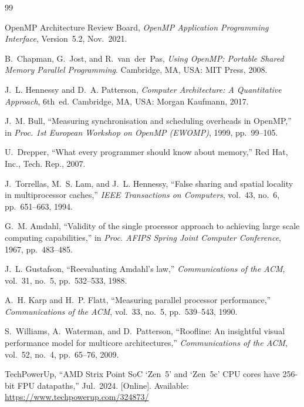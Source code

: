 \documentclass[conference,a4paper]{IEEEtran}
\begin{document}
\begingroup
\renewcommand{\section}[2]{}
\begin{thebibliography}{99}

OpenMP Architecture Review Board, \emph{OpenMP Application Programming
Interface}, Version~5.2, Nov.~2021.

B.~Chapman, G.~Jost, and R.~van~der~Pas, \emph{Using OpenMP: Portable Shared
Memory Parallel Programming}. Cambridge, MA, USA: MIT Press, 2008.

J.~L. Hennessy and D.~A. Patterson, \emph{Computer Architecture: A Quantitative
Approach}, 6th~ed. Cambridge, MA, USA: Morgan Kaufmann, 2017.

J.~M. Bull, ``Measuring synchronisation and scheduling overheads in OpenMP,''
in \emph{Proc. 1st European Workshop on OpenMP (EWOMP)}, 1999, pp.~99--105.

U.~Drepper, ``What every programmer should know about memory,'' Red Hat, Inc.,
Tech. Rep., 2007.

J.~Torrellas, M.~S. Lam, and J.~L. Hennessy, ``False sharing and spatial
locality in multiprocessor caches,'' \emph{IEEE Transactions on Computers},
vol.~43, no.~6, pp.~651--663, 1994.

G.~M. Amdahl, ``Validity of the single processor approach to achieving large
scale computing capabilities,'' in \emph{Proc. AFIPS Spring Joint Computer
Conference}, 1967, pp.~483--485.

J.~L. Gustafson, ``Reevaluating Amdahl's law,'' \emph{Communications of the
ACM}, vol.~31, no.~5, pp.~532--533, 1988.

A.~H. Karp and H.~P. Flatt, ``Measuring parallel processor performance,''
\emph{Communications of the ACM}, vol.~33, no.~5, pp.~539--543, 1990.

S.~Williams, A.~Waterman, and D.~Patterson, ``Roofline: An insightful visual
performance model for multicore architectures,'' \emph{Communications of the
ACM}, vol.~52, no.~4, pp.~65--76, 2009.

TechPowerUp, ``AMD Strix Point SoC `Zen~5' and `Zen~5c' CPU cores have 256-bit
FPU datapaths,'' Jul.~2024. [Online]. Available:
\url{https://www.techpowerup.com/324873/}


\end{thebibliography}
\end{document}
